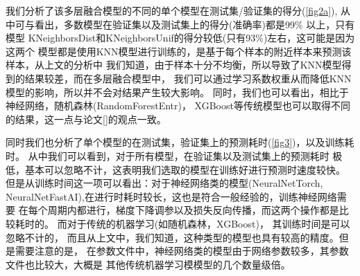 \documentclass[withoutpreface,bwprint]{cumcmthesis} %
\begin{document}
       我们分析了该多层融合模型的不同的单个模型在测试集/验证集的得分(\ref{fig2a}),
       从中可与看出，多数模型在验证集以及测试集上的得分(准确率)都是99\% 以上，只有模型
       KNeighborsDist和KNeighborsUnif的得分较低(只有93\%)左右，这可能是因为这两个
       模型都是使用KNN模型进行训练的，是基于每个样本的附近样本来预测该样本，从上文的分析中
       我们知道，由于样本十分不均衡，所以导致了KNN模型得到的结果较差，而在多层融合模型中，
       我们可以通过学习系数权重从而降低KNN模型的影响，所以并不会对结果产生较大影响。
       同时，我们也可以看出，相比于神经网络，随机森林(RandomForestEntr)，
       XGBoost等传统模型也可以取得不同的结果，这一点与论文[]的观点一致。

       
      同时我们也分析了单个模型的在测试集，验证集上的预测耗时(\ref{fig3})，以及训练耗时。
      从中我们可以看到，对于所有模型，在验证集以及测试集上的预测耗时
      极低，基本可以忽略不计，这表明我们选取的模型在训练好进行预测时速度较快。
      但是从训练时间这一项可以看出：对于神经网络类的模型(NeuralNetTorch,
      NeuralNetFastAI),在进行时耗时较长，这也是符合一般经验的，训练神经网络需要
      在每个周期内都进行，梯度下降调参以及损失反向传播，而这两个操作都是比较耗时的。
      而对于传统的机器学习(如随机森林，XGBoost)， 其训练时间是可以忽略不计的，
      而且从上文中，我们知道，这种类型的模型也具有较高的精度。但是需要注意的是，
      在参数文件中，神经网络类的模型由于网络参数较多，其参数文件也比较大，大概是
      其他传统机器学习模模型的几个数量级倍。
       
  
\end{document}
